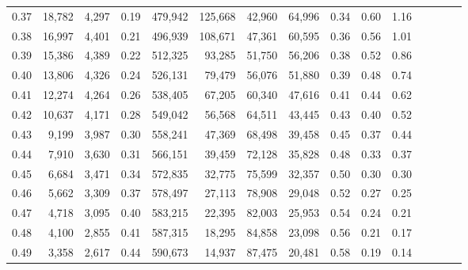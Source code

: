\begin{tabular}{rrrcrrrrrrrrrrr}
0.37 &  18,782 &  4,297 &                                       0.19 &  479,942 &  125,668 &   42,960 &   64,996 &  0.34 &  0.60 &                         1.16 \\
0.38 &  16,997 &  4,401 &                                       0.21 &  496,939 &  108,671 &   47,361 &   60,595 &  0.36 &  0.56 &                         1.01 \\
0.39 &  15,386 &  4,389 &                                       0.22 &  512,325 &   93,285 &   51,750 &   56,206 &  0.38 &  0.52 &                         0.86 \\
0.40 &  13,806 &  4,326 &                                       0.24 &  526,131 &   79,479 &   56,076 &   51,880 &  0.39 &  0.48 &                         0.74 \\
0.41 &  12,274 &  4,264 &                                       0.26 &  538,405 &   67,205 &   60,340 &   47,616 &  0.41 &  0.44 &                         0.62 \\
0.42 &  10,637 &  4,171 &                                       0.28 &  549,042 &   56,568 &   64,511 &   43,445 &  0.43 &  0.40 &                         0.52 \\
0.43 &   9,199 &  3,987 &                                       0.30 &  558,241 &   47,369 &   68,498 &   39,458 &  0.45 &  0.37 &                         0.44 \\
0.44 &   7,910 &  3,630 &                                       0.31 &  566,151 &   39,459 &   72,128 &   35,828 &  0.48 &  0.33 &                         0.37 \\
0.45 &   6,684 &  3,471 &                                       0.34 &  572,835 &   32,775 &   75,599 &   32,357 &  0.50 &  0.30 &                         0.30 \\
0.46 &   5,662 &  3,309 &                                       0.37 &  578,497 &   27,113 &   78,908 &   29,048 &  0.52 &  0.27 &                         0.25 \\
0.47 &   4,718 &  3,095 &                                       0.40 &  583,215 &   22,395 &   82,003 &   25,953 &  0.54 &  0.24 &                         0.21 \\
0.48 &   4,100 &  2,855 &                                       0.41 &  587,315 &   18,295 &   84,858 &   23,098 &  0.56 &  0.21 &                         0.17 \\
0.49 &   3,358 &  2,617 &                                       0.44 &  590,673 &   14,937 &   87,475 &   20,481 &  0.58 &  0.19 &                         0.14 \\

\end{tabular}
